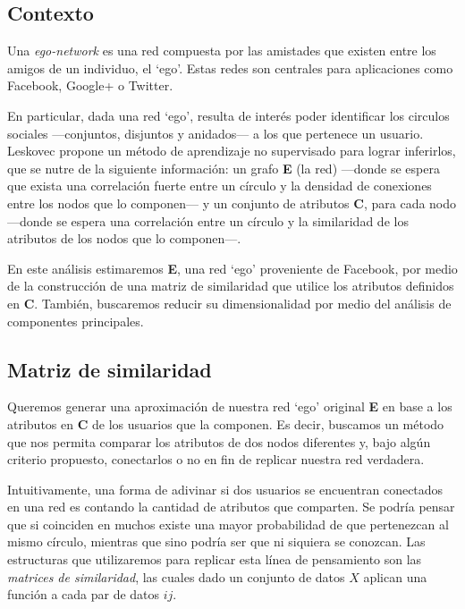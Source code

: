 
\vspace{2em}
\subsection{Contexto} 

Una \textit{ego-network} \cite{Leskovec} es una red compuesta por las amistades que existen entre los amigos de un individuo, el `ego'. Estas redes son centrales para aplicaciones como Facebook, Google+ o Twitter. 

En particular, dada una red `ego', resulta de interés poder identificar los circulos sociales ---conjuntos, disjuntos y anidados--- a los que pertenece un usuario. Leskovec \cite{Leskovec} propone un método de aprendizaje no supervisado para lograr inferirlos, que se nutre de la siguiente información: un grafo \textbf{E} (la red) ---donde se espera que exista una correlación fuerte entre un círculo y la densidad de conexiones entre los nodos que lo componen--- y un conjunto de atributos \textbf{C}, para cada nodo ---donde se espera una correlación entre un círculo y la similaridad de los atributos de los nodos que lo componen---.

\vspace{1em}
En este análisis estimaremos \textbf{E}, una red `ego' proveniente de Facebook, por medio de la construcción de una matriz de similaridad que utilice los atributos definidos en \textbf{C}. También, buscaremos reducir su dimensionalidad por medio del análisis de componentes principales.


\vspace{2em}
\subsection{Matriz de similaridad}

Queremos generar una aproximación de nuestra red `ego' original \textbf{E} en base a los atributos en \textbf{C} de los usuarios que la componen. Es decir, buscamos un método que nos permita comparar los atributos de dos nodos diferentes y, bajo algún criterio propuesto, conectarlos o no en fin de replicar nuestra red verdadera. 

Intuitivamente, una forma de adivinar si dos usuarios se encuentran conectados en una red es contando la cantidad de atributos que comparten. Se podría pensar que si coinciden en muchos existe una mayor probabilidad de que pertenezcan al mismo círculo, mientras que sino podría ser que ni siquiera se conozcan. Las estructuras que utilizaremos para replicar esta línea de pensamiento son las \textit{matrices de similaridad}, las cuales dado un conjunto de datos $X$ aplican una función a cada par de datos $ij$.

